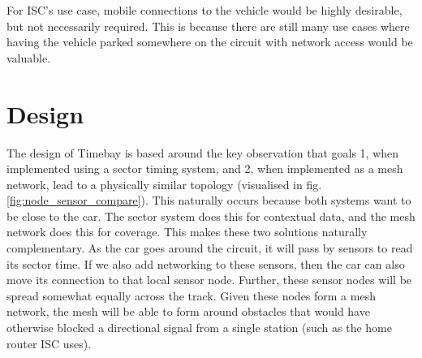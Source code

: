 \documentclass[journal]{IEEEtran}
\begin{document}
For ISC's use case, mobile connections to the vehicle would be highly desirable, but not necessarily required. This is because there are still many use cases where having the vehicle parked somewhere on the circuit with network access would be valuable.

\section{Design}

The design of Timebay is based around the key observation that goals 1, when implemented using a sector timing system, and 2, when implemented as a mesh network, lead to a physically similar topology (visualised in fig. \ref{fig:node_sensor_compare}). This naturally occurs because both systems want to be close to the car. The sector system does this for contextual data, and the mesh network does this for coverage. This makes these two solutions naturally complementary. As the car goes around the circuit, it will pass by sensors to read its sector time. If we also add networking to these sensors, then the car can also move its connection to that local sensor node. Further, these sensor nodes will be spread somewhat equally across the track. Given these nodes form a mesh network, the mesh will be able to form around obstacles that would have otherwise blocked a directional signal from a single station (such as the home router ISC uses).
\end{document}
